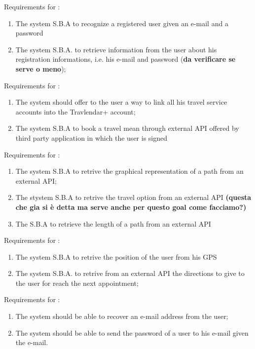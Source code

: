 Requirements for :
\begin{enumerate}[resume]
\renewcommand\labelenumi{\textbf{R\theenumi}}
\item The system S.B.A to recognize a registered user given an e-mail and a password \label{req:R9}
\item The system S.B.A. to retrieve information from the user about his registration informations, i.e. his e-mail and password (\textbf{da verificare se serve o meno}); \label{req:R10}
\end{enumerate}

Requirements for :
\begin{enumerate}[resume]
\renewcommand\labelenumi{\textbf{R\theenumi}}
\item The system should offer to the user a way to link all his travel service accounts into the Travlendar+ account;
\item The system S.B.A to book a travel mean through external API offered by third party application in which the user is signed
\end{enumerate}

Requirements for :
\begin{enumerate}[resume]
\renewcommand\labelenumi{\textbf{R\theenumi}}
\item The system S.B.A to retrive the graphical representation of a path from an external API;
\item The stystem S.B.A to retrive the travel option from an external API \textbf{(questa che gia si è detta ma serve anche per questo goal come facciamo?)}
\item The S.B.A to retrieve the length of a path from an external API  
\end{enumerate}

Requirements for :
\begin{enumerate}[resume]
\renewcommand\labelenumi{\textbf{R\theenumi}}
\item The system S.B.A to retrive the position of the user from his GPS
\item The system S.B.A. to retrive from an external API the directions to give to the user for reach the next appointment;
\end{enumerate}

Requirements for :
\begin{enumerate}[resume]
\renewcommand\labelenumi{\textbf{R\theenumi}}
\item The system should be able to recover an e-mail address from the user;
\item The system should be able to send the password of a user to his e-mail given the e-mail.
\end{enumerate}

